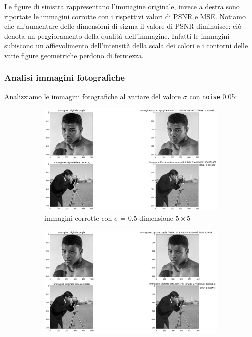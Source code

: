 Le figure di sinistra rappresentano l'immagine originale, invece a destra sono riportate le immagini corrotte 
con i rispettivi valori di PSNR e MSE. 
Notiamo che all'aumentare delle dimensioni di sigma il valore di PSNR diminuisce: ciò denota un peggioramento 
della qualità dell'immagine. Infatti le immagini subiscono un affievolimento dell'intensità della scala dei 
colori e i contorni delle varie figure geometriche perdono di fermezza. 

{\color{bblue}\subsubsection{Analisi immagini fotografiche}}
Analizziamo le immagini fotografiche al variare del valore $\sigma$ con \verb|noise| 0.05:
\begin{figure}[H]
    \centering
    \begin{subfigure}{0.67\textwidth}
        \centering
        \includegraphics[width=\textwidth]{confrontiPuntoUno/5-0.5-0.02.png}
        \caption{immagini corrotte con $\sigma = 0.5$ dimensione $5 \times 5$}
        \label{fig:fotogrCorrotte5x5}
    \end{subfigure}
    \begin{subfigure}{0.67\textwidth}
        \centering
        \includegraphics[width=\textwidth]{confrontiPuntoUno/7-1-0.02.png}

\end{subfigure}
\end{figure}

